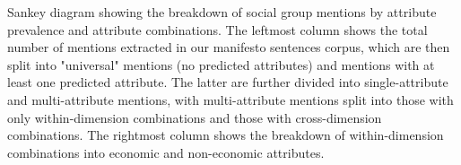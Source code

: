 Sankey diagram showing the breakdown of social group mentions by attribute prevalence and attribute combinations. The leftmost column shows the total number of mentions extracted in our manifesto sentences corpus, which are then split into "universal" mentions (no predicted attributes) and mentions with at least one predicted attribute. The latter are further divided into single-attribute and multi-attribute mentions, with multi-attribute mentions split into those with only within-dimension combinations and those with cross-dimension combinations. The rightmost column shows the breakdown of within-dimension combinations into economic and non-economic attributes.